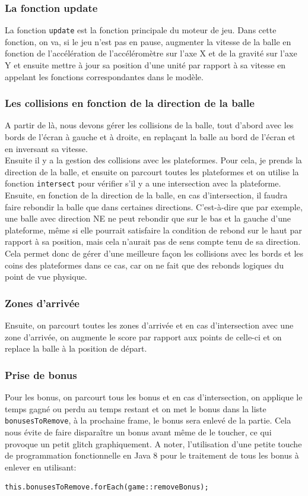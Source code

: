 \documentclass{article}
\begin{document}
\subsubsection{La fonction update}
La fonction \verb+update+ est la fonction principale du moteur de jeu. Dans cette fonction, on va, si le jeu n'est pas en pause, augmenter la vitesse de la balle en fonction de l'accélération de l'accéléromètre sur l'axe X et de la gravité sur l'axe Y et ensuite mettre à jour sa position d'une unité par rapport à sa vitesse en appelant les fonctions correspondantes dans le modèle.
\subsubsection{Les collisions en fonction de la direction de la balle}
A partir de là, nous devons gérer les collisions de la balle, tout d'abord avec les bords de l'écran à gauche et à droite, en replaçant la balle au bord de l'écran et en inversant sa vitesse. \\

Ensuite il y a la gestion des collisions avec les plateformes. Pour cela, je prends la direction de la balle, et ensuite on parcourt toutes les plateformes et on utilise la fonction \verb+intersect+ pour vérifier s'il y a une intersection avec la plateforme. Ensuite, en fonction de la direction de la balle, en cas d'intersection, il faudra faire rebondir la balle que dans certaines directions. C'est-à-dire que par exemple, une balle avec direction NE ne peut rebondir que sur le bas et la gauche d'une plateforme, même si elle pourrait satisfaire la condition de rebond sur le haut par rapport à sa position, mais cela n'aurait pas de sens compte tenu de sa direction. Cela permet donc de gérer d'une meilleure façon les collisions avec les bords et les coins des plateformes dans ce cas, car on ne fait que des rebonds logiques du point de vue physique.
\subsubsection{Zones d'arrivée}
Ensuite, on parcourt toutes les zones d'arrivée et en cas d'intersection avec une zone d'arrivée, on augmente le score par rapport aux points de celle-ci et on replace la balle à la position de départ.
\subsubsection{Prise de bonus}
Pour les bonus, on parcourt tous les bonus et en cas d'intersection, on applique le temps gagné ou perdu au temps restant et on met le bonus dans la liste \verb+bonusesToRemove+, à la prochaine frame, le bonus sera enlevé de la partie. Cela nous évite de faire disparaître un bonus avant même de le toucher, ce qui provoque un petit glitch graphiquement. A noter, l'utilisation d'une petite touche de programmation fonctionnelle en Java 8 pour le traitement de tous les bonus à enlever en utilisant:
\begin{verbatim}
this.bonusesToRemove.forEach(game::removeBonus);
\end{verbatim}
\end{document}
